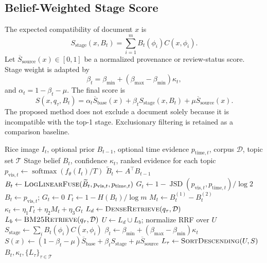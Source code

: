 \documentclass[conference]{IEEEtran}
\newcommand{\softmax}{\operatorname{softmax}}
\begin{document}
\subsection{Belief-Weighted Stage Score}
The expected compatibility of document $x$ is
\begin{equation}
S_{\mathrm{stage}}(x,B_t)=\sum_{i=1}^{m}B_t(\phi_i)C(x,\phi_i).
\end{equation}
Let $\overline{S}_{\mathrm{source}}(x)\in[0,1]$ be a normalized provenance or review-status score. Stage weight is adapted by
\begin{equation}
\beta_t=\beta_{\min}+(\beta_{\max}-\beta_{\min})\kappa_t,
\end{equation}
and $\alpha_t=1-\beta_t-\mu$. The final score is
\begin{equation}
S(x,q_{\tau},B_t)=
\alpha_t\overline{S}_{\mathrm{base}}(x)+
\beta_tS_{\mathrm{stage}}(x,B_t)+
\mu\overline{S}_{\mathrm{source}}(x).
\end{equation}
The proposed method does not exclude a document solely because it is incompatible with the top-1 stage. Exclusionary filtering is retained as a comparison baseline.

\begin{algorithm}[t]
\caption{Image-driven confidence-aware retrieval}
\label{alg:image}
\begin{algorithmic}[1]
\Require Rice image $I_t$, optional prior $B_{t-1}$, optional time evidence $p_{\mathrm{time},t}$, corpus $\mathcal{D}$, topic set $\mathcal{T}$
\Ensure Stage belief $B_t$, confidence $\kappa_t$, ranked evidence for each topic
\State $p_{\mathrm{vis},t}\gets\softmax(f_{\theta}(I_t)/T)$
    \State $\widetilde{B}_t\gets A^{\top}B_{t-1}$
    \State $B_t\gets\textsc{LogLinearFuse}(\widetilde{B}_t,p_{\mathrm{vis},t},p_{\mathrm{time},t})$
    \State $G_t\gets1-\operatorname{JSD}(p_{\mathrm{vis},t},p_{\mathrm{time},t})/\log2$
\Else
    \State $B_t\gets p_{\mathrm{vis},t}$; $G_t\gets0$
\EndIf
\State $\Gamma_t\gets1-H(B_t)/\log m$
\State $M_t\gets B_t^{(1)}-B_t^{(2)}$
\State $\kappa_t\gets\eta_1\Gamma_t+\eta_2M_t+\eta_3G_t$
    \State $L_d\gets\textsc{DenseRetrieve}(q_{\tau},\mathcal{D})$
    \State $L_b\gets\textsc{BM25Retrieve}(q_{\tau},\mathcal{D})$
    \State $U\gets L_d\cup L_b$; normalize RRF over $U$
        \State $S_{\mathrm{stage}}\gets\sum_iB_t(\phi_i)C(x,\phi_i)$
        \State $\beta_t\gets\beta_{\min}+(\beta_{\max}-\beta_{\min})\kappa_t$
        \State $S(x)\gets(1-\beta_t-\mu)\overline{S}_{\mathrm{base}}+\beta_tS_{\mathrm{stage}}+\mu\overline{S}_{\mathrm{source}}$
    \EndFor
    \State $L_{\tau}\gets\textsc{SortDescending}(U,S)$
\EndFor
\State \Return $B_t,\kappa_t,\{L_{\tau}\}_{\tau\in\mathcal{T}}$
\end{algorithmic}
\end{algorithm}
\end{document}
